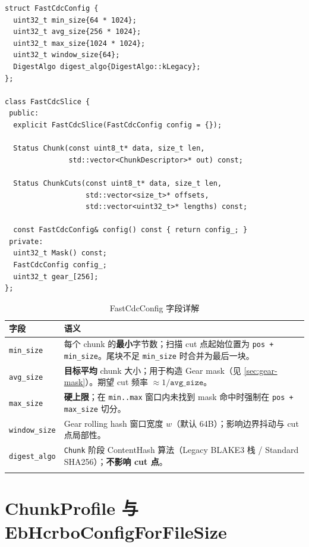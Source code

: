 \begin{lstlisting}[caption={FastCdcConfig 与 FastCdcSlice 接口（\filepath{fast\_cdc.h}）},label={lst:fast-cdc-h}]
struct FastCdcConfig {
  uint32_t min_size{64 * 1024};
  uint32_t avg_size{256 * 1024};
  uint32_t max_size{1024 * 1024};
  uint32_t window_size{64};
  DigestAlgo digest_algo{DigestAlgo::kLegacy};
};

class FastCdcSlice {
 public:
  explicit FastCdcSlice(FastCdcConfig config = {});

  Status Chunk(const uint8_t* data, size_t len,
               std::vector<ChunkDescriptor>* out) const;

  Status ChunkCuts(const uint8_t* data, size_t len,
                   std::vector<size_t>* offsets,
                   std::vector<uint32_t>* lengths) const;

  const FastCdcConfig& config() const { return config_; }
 private:
  uint32_t Mask() const;
  FastCdcConfig config_;
  uint32_t gear_[256];
};
\end{lstlisting}

\begin{longtable}{@{}p{3.2cm}p{10.8cm}@{}}
\toprule
\textbf{字段} & \textbf{语义} \\
\midrule
\endhead
\texttt{min\_size} &
  每个 chunk 的\textbf{最小}字节数；扫描 cut 点起始位置为 \texttt{pos + min\_size}。尾块不足 \texttt{min\_size} 时合并为最后一块。 \\
\texttt{avg\_size} &
  \textbf{目标平均} chunk 大小；用于构造 Gear mask（见 \cref{sec:gear-mask}）。期望 cut 频率 $\approx 1/\texttt{avg\_size}$。 \\
\texttt{max\_size} &
  \textbf{硬上限}；在 \texttt{min..max} 窗口内未找到 mask 命中时强制在 \texttt{pos + max\_size} 切分。 \\
\texttt{window\_size} &
  Gear rolling hash 窗口宽度 $w$（默认 64B）；影响边界抖动与 cut 点局部性。 \\
\texttt{digest\_algo} &
  \texttt{Chunk} 阶段 ContentHash 算法（Legacy BLAKE3 栈 / Standard SHA256）；\textbf{不影响 cut 点}。 \\
\bottomrule
\caption{FastCdcConfig 字段详解}
\label{tab:fastcdc-config}
\end{longtable}

\section{ChunkProfile 与 EbHcrboConfigForFileSize}
\label{sec:chunk-profile}

